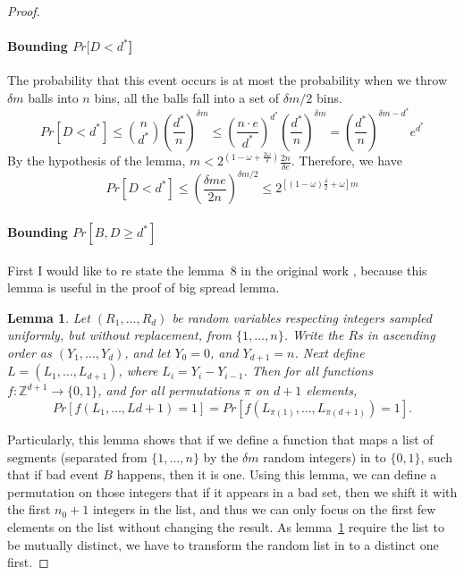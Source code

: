 \documentclass[a4paper, oneside]{article}
\newtheorem{lemma}{Lemma}
\begin{document}
\begin{proof}
  \paragraph{Bounding $Pr[D < d^*$]}
  The probability that this event occurs is at most the probability when we throw $\delta m$ balls into $n$ bins, all the balls fall into a set of
  $\delta m/2$ bins.
  \begin{equation}
    Pr[D < d^*] \leq \binom{n}{d^*}(\frac{d^*}{n})^{\delta m} \leq (\frac{n \cdot e}{d^*})^{d^*}(\frac{d^*}{n})^{\delta m} = (\frac{d^*}{n})^{\delta m - d^*}e^{d^*}
  \end{equation}
  By the hypothesis of the lemma, $m < 2^{(1-\omega + \frac{2\omega}{\delta})}\frac{2n}{\delta e}$. Therefore, we have
  \begin{equation}
    Pr[D < d^*] \leq (\frac{\delta me}{2n})^{\delta m/2} \leq 2^{[(1-\omega)\frac{\delta}{2}+\omega]m}
  \end{equation}
  
  \paragraph{Bounding $Pr[B, D \geq d^*]$}
  First I would like to re state the lemma~8 in the original work \cite{corrigan2016balloon}, because this lemma is useful in the proof of big spread lemma.
  \begin{lemma}\label{lemma::randommap}
    Let $(R_1,\dots,R_d)$ be random variables respecting integers sampled uniformly, but without replacement, from $\{1,\dots,n\}$. Write the $R$s in ascending
    order as $(Y_1,\dots,Y_d)$, and let $Y_0 = 0$, and $Y_{d+1} = n$. Next define $L = (L_1,\dots,L_{d+1})$, where $L_i = Y_i - Y_{i-1}$. Then for all functions
    $f:\mathbb{Z}^{d+1} \rightarrow \{0,1\}$, and for all permutations $\pi$ on $d+1$ elements,
    \begin{equation}
      Pr[f(L_1,\dots,L{d+1}) = 1] = Pr[f(L_{\pi(1)},\dots,L_{\pi(d+1)}) = 1].
    \end{equation}
  \end{lemma}

  Particularly, this lemma shows that if we define a function that maps a list of segments (separated from $\{1,\dots,n\}$ by the $\delta m$ random integers)
  in to $\{0,1\}$, such that
  if bad event $B$ happens, then it is one. Using this lemma, we can define a permutation on those integers that if it appears in a bad set, then we shift it with
  the first $n_0+1$ integers in the list, and thus we can only focus on the first few elements on the list without changing the result. As lemma~\ref{lemma::randommap}
  require the list to be mutually distinct, we have to transform the random list in to a distinct one first.
  

\end{proof}
\end{document}
